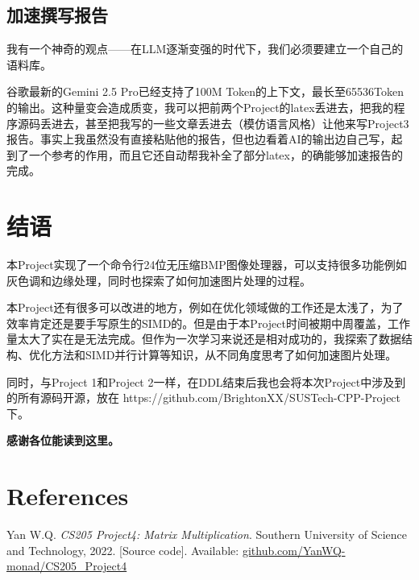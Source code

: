 \documentclass[11pt]{article}
\begin{document}
\subsection{加速撰写报告}
我有一个神奇的观点——在LLM逐渐变强的时代下，我们必须要建立一个自己的语料库。


谷歌最新的Gemini 2.5 Pro已经支持了100M Token的上下文，最长至65536Token的输出。这种量变会造成质变，我可以把前两个Project的latex丢进去，把我的程序源码丢进去，甚至把我写的一些文章丢进去（模仿语言风格）让他来写Project3报告。事实上我虽然没有直接粘贴他的报告，但也边看着AI的输出边自己写，起到了一个参考的作用，而且它还自动帮我补全了部分latex，的确能够加速报告的完成。
\section{结语}
本Project实现了一个命令行24位无压缩BMP图像处理器，可以支持很多功能例如灰色调和边缘处理，同时也探索了如何加速图片处理的过程。

本Project还有很多可以改进的地方，例如在优化领域做的工作还是太浅了，为了效率肯定还是要手写原生的SIMD的。但是由于本Project时间被期中周覆盖，工作量太大了实在是无法完成。但作为一次学习来说还是相对成功的，我探索了数据结构、优化方法和SIMD并行计算等知识，从不同角度思考了如何加速图片处理。


同时，与Project 1和Project 2一样，在DDL结束后我也会将本次Project中涉及到的所有源码开源，放在 https://github.com/BrightonXX/SUSTech-CPP-Project 下。


\textbf{感谢各位能读到这里。}
\newpage %
\section*{References}
\begin{thebibliography}{9}

Yan W.Q. \textit{CS205 Project4: Matrix Multiplication}. 
Southern University of Science and Technology, 2022. 
[Source code]. Available: 
\href{https://github.com/YanWQ-monad/SUSTech_CS205_Projects}{github.com/YanWQ-monad/CS205\_Project4} 



\end{thebibliography}
\end{document}
